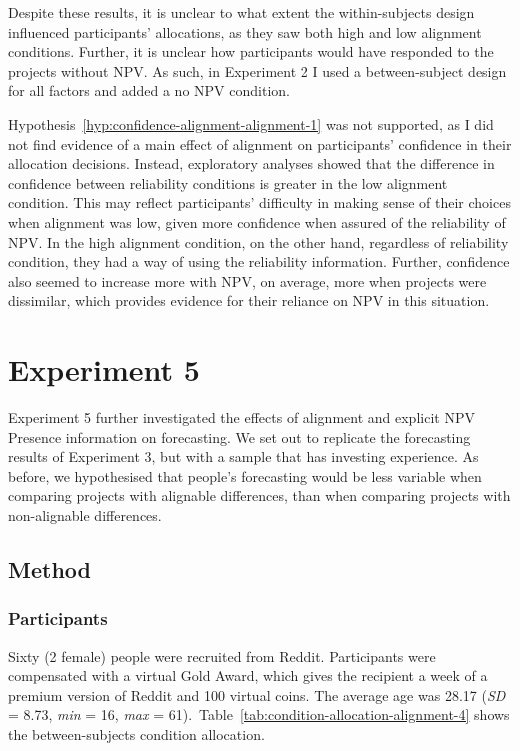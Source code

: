 \documentclass[a4paper, nobind, dvipsnames]{templates/ociamthesis}
\theoremstyle{definition}
\theoremstyle{definition}
\theoremstyle{definition}
\theoremstyle{definition}
\theoremstyle{remark}
\begin{document}
Despite these results, it is unclear to what extent the within-subjects design
influenced participants' allocations, as they saw both high and low alignment
conditions. Further, it is unclear how participants would have responded to the
projects without NPV. As such, in Experiment 2 I used a between-subject design
for all factors and added a no NPV condition.

Hypothesis~\ref{hyp:confidence-alignment-alignment-1} was not supported, as I
did not find evidence of a main effect of alignment on participants' confidence
in their allocation decisions. Instead, exploratory analyses showed that the
difference in confidence between reliability conditions is greater in the low
alignment condition. This may reflect participants' difficulty in making sense
of their choices when alignment was low, given more confidence when assured of
the reliability of NPV. In the high alignment condition, on the other hand,
regardless of reliability condition, they had a way of using the reliability
information. Further, confidence also seemed to increase more with NPV, on
average, more when projects were dissimilar, which provides evidence for their
reliance on NPV in this situation.

\hypertarget{alignment-4}{%
\section{Experiment 5}\label{alignment-4}}

Experiment 5 further investigated the effects of alignment and explicit NPV
Presence information on forecasting. We set out to replicate the forecasting
results of Experiment 3, but with a sample that has investing experience. As
before, we hypothesised that people's forecasting would be less variable when
comparing projects with alignable differences, than when comparing projects with
non-alignable differences.

\hypertarget{method-13}{%
\subsection{Method}\label{method-13}}

\hypertarget{participants-13}{%
\subsubsection{Participants}\label{participants-13}}

Sixty (2 female) people were recruited from Reddit. Participants were compensated with a virtual Gold Award, which gives the recipient a week of a premium version of Reddit and 100 virtual coins. The average age was 28.17 (\emph{SD} = 8.73, \emph{min} = 16, \emph{max} = 61).~Table~\ref{tab:condition-allocation-alignment-4}
shows the between-subjects condition allocation.
\end{document}
